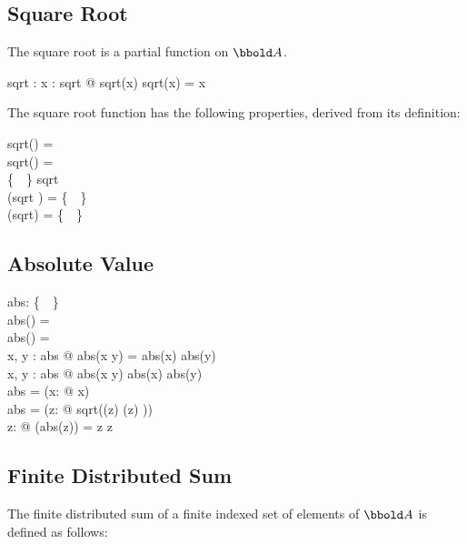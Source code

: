 \documentclass[12pt]{article}
\begin{document}
\subsection{Square Root}
\label{sec:square-root}
The square root is a partial function on $\arithmos$.
\begin{axdef}
  sqrt : \arithmos \pfun \arithmos
  \where
  \forall x : \dom sqrt @ sqrt(x) \amult sqrt(x) = x
\end{axdef}

The square root function has the following properties, derived from
its definition:
\begin{zed}
  sqrt(\azero) = \azero\\
  sqrt(\aone) = \aone\\
  \realplus \cup \{~\azero~\} \subseteq \dom sqrt\\
  \dom (sqrt \rres \real) = \realplus \cup \{~\azero~\}\\
  \ran (\real \dres sqrt) = \realplus \cup \{~\azero~\}\\
\end{zed}

\subsection{Absolute Value}
\label{sec:abs}

\begin{axdef}
  abs: \arithmos \pfun \realplus \cup \{~\azero~\}\\
  \where
  abs(\azero) = \azero\\
  abs(\aone) = \aone\\
  \forall x, y : \dom abs @ abs(x \amult y) = abs(x) \amult abs(y)\\
  \forall x, y : \dom abs @ abs(x \aplus y) \aleq abs(x) \aplus
  abs(y)\\
  \real \dres abs = \id \real \oplus (\lambda x: \realminus @ \aneg
  x)\\
  \complex \dres abs = (\lambda z: \complex @ sqrt(\Re(z) 
  \aplus \Im(z) ))\\
  \forall z: \complex @ (abs(z))  = z \amult z\aconj\\
\end{axdef}

\subsection{Finite Distributed Sum}
\label{sec:fin-distr-sum}
The finite distributed sum of a finite indexed set of elements of
$\arithmos$ is defined as follows:
\end{document}
